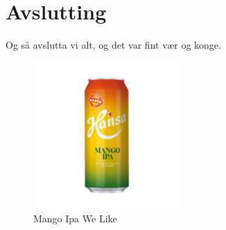\chapter{Avslutting}
\thispagestyle{fancy}
Og så avslutta vi alt, og det var fint vær og konge.

\begin{figure}[htbp]
    \centering
    \includegraphics[width=0.5\textwidth]{Bilder/mango.jpg}
    \caption{Mango Ipa We Like}\label{fig:Mango}
\end{figure}
    